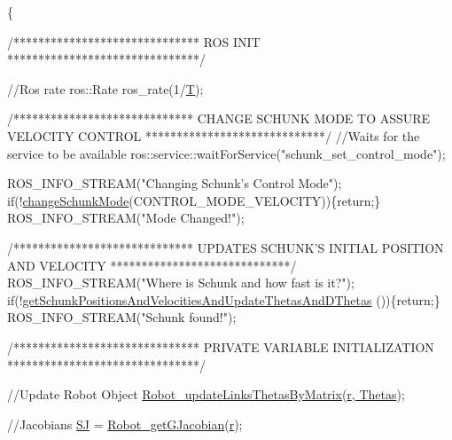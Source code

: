\begin{DoxyCode}
                                           \{

        \textcolor{comment}{/******************************}
\textcolor{comment}{                                ROS INIT}
\textcolor{comment}{        *******************************/}

        \textcolor{comment}{//Ros rate}
        ros::Rate ros\_rate(1/\hyperlink{classCartesian__controller_a35c6ddbb9624878f2807ff644a33e832}{T});

        \textcolor{comment}{/*****************************}
\textcolor{comment}{           CHANGE SCHUNK MODE TO ASSURE VELOCITY CONTROL}
\textcolor{comment}{         *****************************/}
        \textcolor{comment}{//Waits for the service to be available}
        ros::service::waitForService(\textcolor{stringliteral}{"schunk\_set\_control\_mode"});

        ROS\_INFO\_STREAM(\textcolor{stringliteral}{"Changing Schunk's Control Mode"});
        \textcolor{keywordflow}{if}(!\hyperlink{classCartesian__controller_aaf006f80e89c08cf040956afbb4cf3c0}{changeSchunkMode}(CONTROL\_MODE\_VELOCITY))\{\textcolor{keywordflow}{return};\}
        ROS\_INFO\_STREAM(\textcolor{stringliteral}{"Mode Changed!"});

        \textcolor{comment}{/*****************************}
\textcolor{comment}{           UPDATES SCHUNK'S INITIAL POSITION AND VELOCITY}
\textcolor{comment}{         *****************************/}
        ROS\_INFO\_STREAM(\textcolor{stringliteral}{"Where is Schunk and how fast is it?"});
        \textcolor{keywordflow}{if}(!\hyperlink{classCartesian__controller_a0d7a63bac84715f6742db738df246f91}{getSchunkPositionsAndVelocitiesAndUpdateThetasAndDThetas}
      ())\{\textcolor{keywordflow}{return};\}
        ROS\_INFO\_STREAM(\textcolor{stringliteral}{"Schunk found!"});


        \textcolor{comment}{/******************************}
\textcolor{comment}{        PRIVATE VARIABLE INITIALIZATION}
\textcolor{comment}{        *******************************/}

        \textcolor{comment}{//Update Robot Object}
        \hyperlink{robot_8h_aa1d3aca5132bd5f347f5966d38fbb966}{Robot\_updateLinksThetasByMatrix}(\hyperlink{classCartesian__controller_a5562129951bd802e4ded77fc716c87a0}{r},\hyperlink{classCartesian__controller_a0a0f818dad601cd9e3e26cb6959b8eb6}{
      Thetas});

        \textcolor{comment}{//Jacobians}
        \hyperlink{classCartesian__controller_a98fdac06d136ac3dba0102d97cd5dd36}{SJ}  = \hyperlink{robot_8h_a61464c237c56f3db3f79b0350df80ddb}{Robot\_getGJacobian}(\hyperlink{classCartesian__controller_a5562129951bd802e4ded77fc716c87a0}{r});


\end{DoxyCode}
